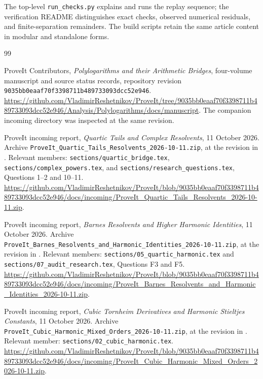 \documentclass[11pt]{article}
\numberwithin{equation}{section}
\theoremstyle{plain}
\theoremstyle{definition}
\theoremstyle{remark}
\newcommand{\src}[1]{\texttt{\small\nolinkurl{#1}}}
\begin{document}
The top-level \src{run_checks.py} explains and runs the replay sequence;
the verification README distinguishes exact checks, observed numerical
residuals, and finite-separation remainders. The build scripts retain
the same article content in modular and standalone forms.



\clearpage
\begin{thebibliography}{99}

ProveIt Contributors, \emph{Polylogarithms and their Arithmetic Bridges},
four-volume manuscript and source status records, repository revision
\src{9035bb0eaaf70f3398711b489733093dcc52e946}.
\url{https://github.com/VladimirReshetnikov/ProveIt/tree/9035bb0eaaf70f3398711b489733093dcc52e946/Analysis/Polylogarithms/docs/manuscript}.
The companion incoming directory was inspected at the same revision.

ProveIt incoming report, \emph{Quartic Tails and Complex Resolvents},
11 October 2026.
Archive \src{ProveIt_Quartic_Tails_Resolvents_2026-10-11.zip},
at the revision in \cite{repo:main}.
Relevant members: \src{sections/quartic_bridge.tex},
\src{sections/complex_powers.tex}, and
\src{sections/research_questions.tex}, Questions 1--2 and 10--11.
\url{https://github.com/VladimirReshetnikov/ProveIt/blob/9035bb0eaaf70f3398711b489733093dcc52e946/docs/incoming/ProveIt_Quartic_Tails_Resolvents_2026-10-11.zip}.

ProveIt incoming report,
\emph{Barnes Resolvents and Higher Harmonic Identities},
11 October 2026.
Archive \src{ProveIt_Barnes_Resolvents_and_Harmonic_Identities_2026-10-11.zip},
at the revision in \cite{repo:main}.
Relevant members: \src{sections/05_quartic_harmonic.tex} and
\src{sections/07_audit_research.tex}, Questions F3 and F5.
\url{https://github.com/VladimirReshetnikov/ProveIt/blob/9035bb0eaaf70f3398711b489733093dcc52e946/docs/incoming/ProveIt_Barnes_Resolvents_and_Harmonic_Identities_2026-10-11.zip}.

ProveIt incoming report,
\emph{Cubic Tornheim Derivatives and Harmonic Stieltjes Constants},
11 October 2026.
Archive \src{ProveIt_Cubic_Harmonic_Mixed_Orders_2026-10-11.zip},
at the revision in \cite{repo:main}.
Relevant member: \src{sections/02_cubic_harmonic.tex}.
\url{https://github.com/VladimirReshetnikov/ProveIt/blob/9035bb0eaaf70f3398711b489733093dcc52e946/docs/incoming/ProveIt_Cubic_Harmonic_Mixed_Orders_2026-10-11.zip}.


\end{thebibliography}
\end{document}

